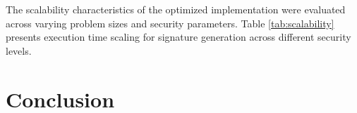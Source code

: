 \documentclass[journal]{IEEEtran}
\begin{document}
The scalability characteristics of the optimized implementation were evaluated across varying problem sizes and security parameters. Table \ref{tab:scalability} presents execution time scaling for signature generation across different security levels.




\section{Conclusion}\label{sec:conclusion}


\end{document}
